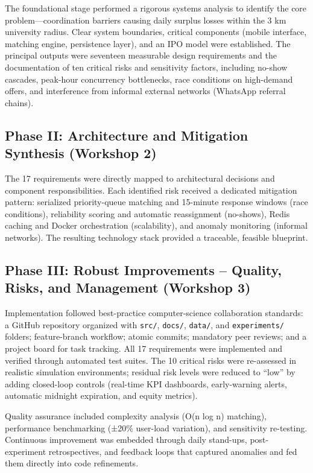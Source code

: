 \documentclass[9pt,conference]{IEEEtran}
\begin{document}
The foundational stage performed a rigorous systems analysis to identify the core problem—coordination barriers causing daily surplus losses within the 3 km university radius. Clear system boundaries, critical components (mobile interface, matching engine, persistence layer), and an IPO model were established. The principal outputs were seventeen measurable design requirements and the documentation of ten critical risks and sensitivity factors, including no-show cascades, peak-hour concurrency bottlenecks, race conditions on high-demand offers, and interference from informal external networks (WhatsApp referral chains).

\subsection{Phase II: Architecture and Mitigation Synthesis (Workshop 2)}

The 17 requirements were directly mapped to architectural decisions and component responsibilities. Each identified risk received a dedicated mitigation pattern: serialized priority-queue matching and 15-minute response windows (race conditions), reliability scoring and automatic reassignment (no-shows), Redis caching and Docker orchestration (scalability), and anomaly monitoring (informal networks). The resulting technology stack provided a traceable, feasible blueprint.

\subsection{Phase III: Robust Improvements – Quality, Risks, and Management (Workshop 3)}

Implementation followed best-practice computer-science collaboration standards: a GitHub repository organized with \texttt{src/}, \texttt{docs/}, \texttt{data/}, and \texttt{experiments/} folders; feature-branch workflow; atomic commits; mandatory peer reviews; and a project board for task tracking. All 17 requirements were implemented and verified through automated test suites. The 10 critical risks were re-assessed in realistic simulation environments; residual risk levels were reduced to “low” by adding closed-loop controls (real-time KPI dashboards, early-warning alerts, automatic midnight expiration, and equity metrics).

Quality assurance included complexity analysis (O(n log n) matching), performance benchmarking (±20\% user-load variation), and sensitivity re-testing. Continuous improvement was embedded through daily stand-ups, post-experiment retrospectives, and feedback loops that captured anomalies and fed them directly into code refinements.
\end{document}
